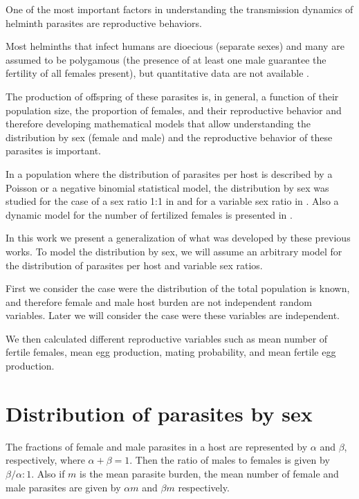 \documentclass[useAMS,referee,usenatbib]{biom}
\begin{document}
One of the most important factors in understanding the transmission dynamics of helminth parasites are reproductive behaviors.

Most helminths that infect humans are dioecious (separate sexes) and many are assumed to be polygamous (the presence of at least one male guarantee the fertility of all females present), but quantitative data are not available \cite{anderson1992infectious}.

The production of offspring of these parasites is, in general, a function of their population size, the proportion of females, and their reproductive behavior and therefore
developing mathematical models that allow understanding the distribution by sex (female and male) and the reproductive behavior of these parasites is important.


In a population where the distribution of parasites per host is described by a Poisson or a negative binomial statistical model, the distribution by sex was studied for the case of a sex ratio 1:1 in \cite{may1977togetherness} and for a variable sex ratio in \cite{may1993biased}.
Also a dynamic model for the number of fertilized females is presented in \cite{leyton1968stochastic}.


In this work we present a generalization of what was developed by these previous works.
To model the distribution by sex, we will assume an arbitrary model for the distribution of parasites per host and variable sex ratios. 

First we consider the case were the distribution of the total population is known, and therefore female and male host burden are not independent random variables. Later we will consider the case were these variables are independent. 


We then calculated different reproductive variables such as mean number of fertile females, mean egg production, mating probability, and mean fertile egg production.

\section{Distribution of parasites by sex}
\label{sec:distsexo}
The fractions of female and male parasites in a host are represented  by $\alpha$ and $\beta$, respectively, where $\alpha+\beta=1$.
Then the ratio of males to females is given by $\beta / \alpha : 1$. Also if $m$ is the mean parasite burden, the mean number of
female and male parasites are given by $\alpha m$ and $\beta m $ respectively.
\end{document}
